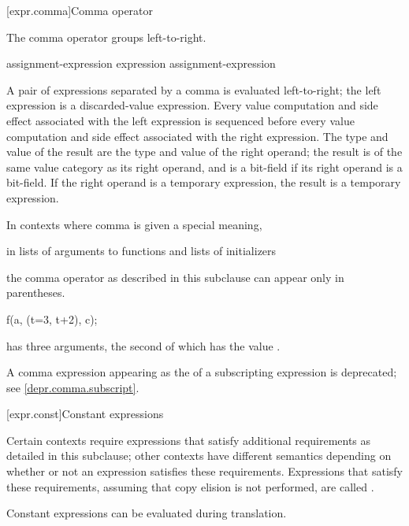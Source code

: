 [expr.comma]{Comma operator}%
%
%
%
%
%

\pnum
The comma operator groups left-to-right.

\begin{bnf}
\br
    assignment-expression\br
    expression \terminal{,} assignment-expression
\end{bnf}

A pair of expressions separated by a comma is evaluated left-to-right;
the left expression is
a discarded-value expression.
Every
%
value computation and side effect
associated with the left expression is sequenced before every value
computation and side effect associated with the right expression.
%
The type and value of the
result are the type and value of the right operand; the result is of the same
value category as its right operand, and is a bit-field if its
right operand is a bit-field.
If the right operand is a temporary expression,
the result is a temporary expression.

\pnum
In contexts where comma is given a special meaning,
\begin{example}
in
lists of arguments to functions and lists of
initializers
\end{example}
the comma operator as
described in this subclause can appear only in parentheses.
\begin{example}
\begin{codeblock}
f(a, (t=3, t+2), c);
\end{codeblock}
has three arguments, the second of which has the value
.
\end{example}

\pnum
\begin{note}
A comma expression
appearing as the 
of a subscripting expression is deprecated;
see \ref{depr.comma.subscript}.
\end{note}

[expr.const]{Constant expressions}%

\pnum
Certain contexts require expressions that satisfy additional
requirements as detailed in this subclause; other contexts have different
semantics depending on whether or not an expression satisfies these requirements.
Expressions that satisfy these requirements,
assuming that copy elision is not performed,
are called
%
.
\begin{note}
Constant expressions can be evaluated
during translation.
\end{note}

